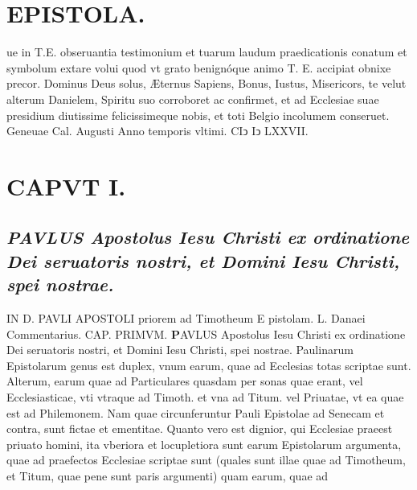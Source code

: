 \documentclass{article}
\begin{document}
\begin{pages}
\section*{EPISTOLA. }\pstart ue in T.E. obseruantia testimonium et tuarum laudum praedicationis conatum et symbolum extare volui quod vt grato benignóque animo T. E. accipiat obnixe precor. Dominus Deus solus, Æternus Sapiens, Bonus, Iustus, Misericors, te velut alterum Danielem, Spiritu suo corroboret ac confirmet, et ad Ecclesiae suae presidium diutissime felicissimeque nobis, et toti Belgio incolumem conseruet. Geneuae Cal. Augusti Anno temporis vltimi. CIↄ Iↄ LXXVII.  \pend
\endnumbering 
\section{CAPVT  I. }\beginnumbering \pstart
{}
\subsection*{\textit{PAVLUS Apostolus Iesu Christi ex ordinatione Dei seruatoris nostri, et Domini Iesu Christi, spei nostrae.}}IN D. PAVLI APOSTOLI priorem ad Timotheum E pistolam. L. Danaei Commentarius. CAP. PRIMVM.
\textbf{P}AVLUS Apostolus Iesu Christi ex ordinatione Dei seruatoris nostri, et Domini Iesu Christi, spei nostrae.  \pend\pstart Paulinarum Epistolarum genus est duplex, vnum earum, quae ad Ecclesias totas scriptae sunt. Alterum, earum quae ad Particulares quasdam per sonas quae erant, vel Ecclesiasticae, vti vtraque ad Timoth. et vna ad Titum. vel Priuatae, vt ea quae est ad Philemonem. Nam quae circunferuntur Pauli Epistolae ad Senecam et contra, sunt fictae et ementitae. Quanto vero est dignior, qui Ecclesiae praeest priuato homini, ita vberiora et locupletiora sunt earum Epistolarum argumenta, quae ad praefectos Ecclesiae scriptae sunt (quales sunt illae quae ad Timotheum, et Titum, quae pene sunt paris argumenti) quam earum, quae ad  \pend

\end{pages}
\end{document}
